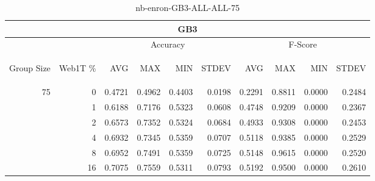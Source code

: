 \begin{center}
\begin{table}[htbp] 
 \begin{center}
\begin{tabular}{ | r | r | r | r | r | r | r | r | r | r |}
\hline
\multicolumn{10}{|c|}{GB3}\\
\hline
 & & \multicolumn{4}{|c|}{Accuracy} & \multicolumn{4}{|c|}{F-Score}\\ \cline{3-10}
\begin{sideways}Group Size\end{sideways} & \begin{sideways}Web1T \%\end{sideways} & \begin{sideways}AVG\end{sideways} & \begin{sideways}MAX\end{sideways} & \begin{sideways}MIN\end{sideways} & \begin{sideways}STDEV\end{sideways} & \begin{sideways}AVG\end{sideways} & \begin{sideways}MAX\end{sideways} & \begin{sideways}MIN\end{sideways} & \begin{sideways}STDEV\end{sideways}\\
\hline
\multirow{5}{*}{75}
 & 0 & 0.4721 & 0.4962 & 0.4403 & 0.0198 & 0.2291 & 0.8811 & 0.0000 & 0.2484\\ \cline{2-10}
 & 1 & 0.6188 & 0.7176 & 0.5323 & 0.0608 & 0.4748 & 0.9209 & 0.0000 & 0.2367\\ \cline{2-10}
 & 2 & 0.6573 & 0.7352 & 0.5324 & 0.0684 & 0.4933 & 0.9308 & 0.0000 & 0.2453\\ \cline{2-10}
 & 4 & 0.6932 & 0.7345 & 0.5359 & 0.0707 & 0.5118 & 0.9385 & 0.0000 & 0.2529\\ \cline{2-10}
 & 8 & 0.6952 & 0.7491 & 0.5359 & 0.0725 & 0.5148 & 0.9615 & 0.0000 & 0.2520\\ \cline{2-10}
 & 16 & 0.7075 & 0.7559 & 0.5311 & 0.0793 & 0.5192 & 0.9500 & 0.0000 & 0.2610\\ \cline{2-10}
\hline
\end{tabular}
\caption{nb-enron-GB3-ALL-ALL-75}
\label{table:nb-enron-GB3-ALL-ALL-75}
\end{center}
 \end{table}
\end{center}

